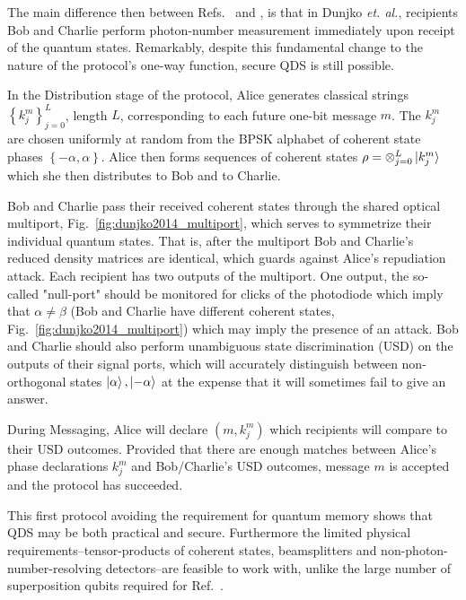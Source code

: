 The main difference then between Refs.~\cite{Dunjko2014} and \cite{Gottesman2001}, is that in Dunjko \emph{et. al.}, recipients Bob and Charlie perform photon-number measurement immediately upon receipt of the quantum states. Remarkably, despite this fundamental change to the nature of the protocol's one-way function, secure QDS is still possible. %


In the Distribution stage of the protocol, Alice generates classical strings $\left\{k_j^m\right\}_{j=0}^L$, length $L$, corresponding to each future one-bit message $m$. The $k_j^m$ are chosen uniformly at random from the BPSK alphabet of coherent state phases $\left\{- \alpha, \alpha\right\}$. Alice then forms sequences of coherent states $\rho = \otimes_{j=0}^L \ket{k_j^m}$ which she then distributes to Bob and to Charlie. 



Bob and Charlie pass their received coherent states through the shared optical multiport, Fig.~\ref{fig:dunjko2014_multiport}, which serves to symmetrize their individual quantum states. That is, after the multiport Bob and Charlie's reduced density matrices are identical, which guards against Alice's repudiation attack. Each recipient has two outputs of the multiport. One output, the so-called "null-port" should be monitored for clicks of the photodiode which imply that $\alpha \ne \beta$ (Bob and Charlie have different coherent states, Fig.~\ref{fig:dunjko2014_multiport}) which may imply the presence of an attack. Bob and Charlie should also perform unambiguous state discrimination (USD) on the outputs of their signal ports, which will accurately distinguish between non-orthogonal states $\ket{\alpha}, \ket{-\alpha}$ at the expense that it will sometimes fail to give an answer. 

During Messaging, Alice will declare $\left(m, k_j^m\right)$ which recipients will compare to their USD outcomes. Provided that there are enough matches between Alice's phase declarations $k_j^m$ and Bob/Charlie's USD outcomes, message $m$ is accepted and the protocol has succeeded.

This first protocol avoiding the requirement for quantum memory shows that QDS may be both practical and secure. Furthermore the limited physical requirements--tensor-products of coherent states, beamsplitters and non-photon-number-resolving detectors--are feasible to work with, unlike the large number of superposition qubits required for Ref.~\cite{Gottesman2001}. %

